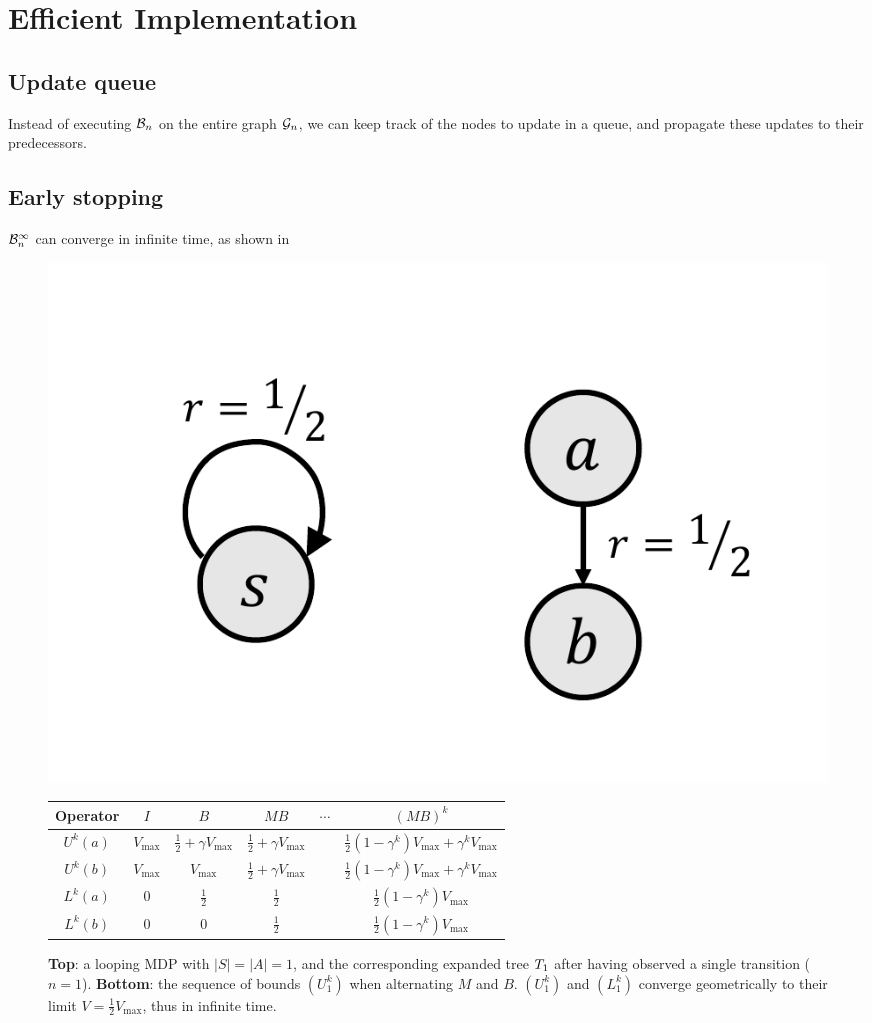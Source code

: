 \documentclass[runningheads]{llncs}
\begin{document}
\section{Efficient Implementation}

\subsection{Update queue}

Instead of executing $\mathcal{B}_n$ on the entire graph $\mathcal{G}_n$, we can keep track of the nodes to update in a queue, and propagate these updates to their predecessors.


\subsection{Early stopping}

$\mathcal{B}_n^\infty$ can converge in infinite time, as shown in 

\begin{figure}[H]
	\centering
	\includegraphics[trim=2.5cm 1cm 1.5cm 2cm, clip, width=0.35\linewidth]{img/loop.pdf}\\
	\begin{tabular}{cccccc}
		\toprule
		Operator & $I$ & $B$ & $M B$ & $\cdots$ & $(M B)^k$ \\
		\midrule
		$U^k(a)$ & $V_{\max}$ & $\frac{1}{2} + \gamma V_{\max}$ & $\frac{1}{2} + \gamma V_{\max}$ && $\frac{1}{2}(1-\gamma^k)V_{\max} + \gamma^k V_{\max}$\\
		$U^k(b)$ & $V_{\max}$ & $V_{\max}$ & $\frac{1}{2} + \gamma V_{\max}$ && $\frac{1}{2}(1-\gamma^k)V_{\max} + \gamma^k V_{\max}$\\
		$L^k(a)$ & $0$ & $\frac{1}{2}$ & $\frac{1}{2}$ && $\frac{1}{2}(1-\gamma^k)V_{\max}$\\
		$L^k(b)$ & $0$ & $0$ & $\frac{1}{2}$ && $\frac{1}{2}(1-\gamma^k)V_{\max}$\\
		\bottomrule
	\end{tabular}
	\caption{\textbf{Top}: a looping MDP with $|S|=|A|=1$, and the corresponding expanded tree $T_1$ after having observed a single transition ($n=1$). \textbf{Bottom}: the sequence of bounds $(U_1^k)$ when alternating $M$ and $B$. $(U_1^k)$ and $(L_1^k)$ converge geometrically to their limit $V = \frac{1}{2}V_{\max}$, thus in infinite time.}
	\label{fig:simple_loop}
\end{figure}
\end{document}

